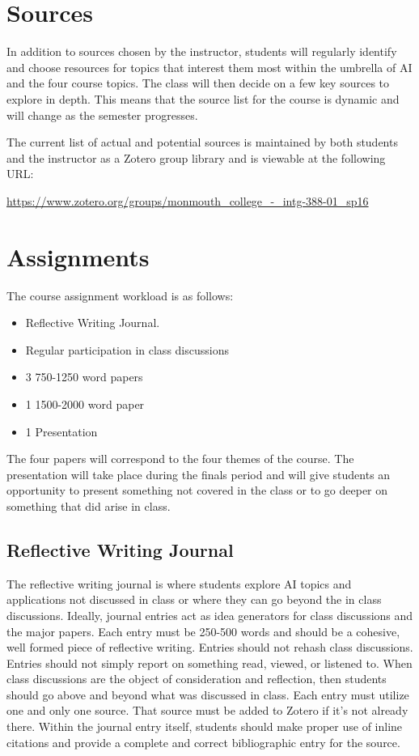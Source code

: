 \documentclass[]{tufte-handout}
\begin{document}
\section{Sources}

In addition to sources chosen by the instructor, students will regularly identify and choose resources for topics that interest them most within the umbrella of AI and the four course topics. The class will then decide on a few key sources to explore in depth. This means that the source list for the course is dynamic and will change as the semester progresses. 

The current list of actual and potential sources is maintained by both students and the instructor as a Zotero group library and is viewable at the following URL:
\vspace{.2in}

\begin{footnotesize}
\url{https://www.zotero.org/groups/monmouth_college_-_intg-388-01_sp16}
\end{footnotesize}

 
\section{Assignments}

The course assignment workload is as follows:
\begin{itemize}
\item Reflective Writing Journal. 
\item Regular participation in class discussions
\item 3 750-1250 word papers
\item 1 1500-2000 word paper
\item 1 Presentation 
\end{itemize}
The four papers will correspond to the four themes of the course. The presentation will take place during the finals period and will give students an opportunity to present something not covered in the class or to go deeper on something that did arise in class.

\subsection{Reflective Writing Journal}

The reflective writing journal is where students explore AI topics and applications not discussed in class or where they can go beyond the in class discussions. Ideally, journal entries act as idea generators for class discussions and the major papers. Each entry must be 250-500 words and should be a cohesive, well formed piece of reflective writing. Entries should not rehash class discussions. Entries should not simply report on something read, viewed, or listened to. When class discussions are the object of consideration and reflection, then students should go above and beyond what was discussed in class. Each entry must utilize one and only one source. That source must be added to Zotero if it's not already there. Within the journal entry itself, students should make proper use of inline citations and provide a complete and correct bibliographic entry for the source. 
\end{document}
